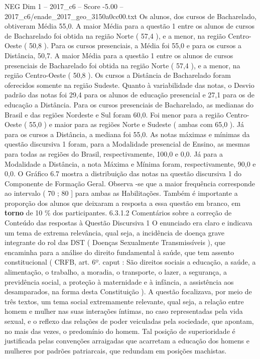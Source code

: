 \begin{textsample}{NEG Dim 1 – 2017\_c6 – Score -5.00 – 2017\_c6/enade\_2017\_geo\_3150a0cc00.txt}
Os alunos, dos cursos de Bacharelado, obtiveram Média 55,0.
A maior Média para a questão 1 entre os alunos de cursos de Bacharelado foi obtida na região Norte ( 57,4 ), e a menor, na região Centro-Oeste ( 50,8 ).
Para os cursos presenciais, a Média foi 55,0 e para os cursos a Distância, 50,7.
A maior Média para a questão 1 entre os alunos de cursos presenciais de Bacharelado foi obtida na região Norte ( 57,4 ), e a menor, na região Centro-Oeste ( 50,8 ).
Os cursos a Distância de Bacharelado foram oferecidos somente na região Sudeste.
Quanto à variabilidade das notas, o Desvio padrão das notas foi 29,4 para os alunos de educação presencial e 27,1 para os de educação a Distância.
Para os cursos presenciais de Bacharelado, as medianas do Brasil e das regiões Nordeste e Sul foram 60,0.
Foi menor para a região Centro-Oeste ( 55,0 ) e maior para as regiões Norte e Sudeste ( ambas com 65,0 ).
Já para os cursos a Distância, a mediana foi 55,0.
As notas máximas e mínimas da questão discursiva 1 foram, para a Modalidade presencial de Ensino, as mesmas para todas as regiões do Brasil, respectivamente, 100,0 e 0,0.
Já para a Modalidade a Distância, a nota Máxima e Mínima foram, respectivamente, 90,0 e 0,0.
O Gráfico 6.7 mostra a distribuição das notas na questão discursiva 1 do Componente de Formação Geral.
Observa -se que a maior frequência corresponde ao intervalo ( 70 ; 80 ] para ambas as Habilitações.
Também é importante a proporção dos alunos que deixaram a resposta a essa questão em branco, em \textbf{torno} de 10 \% dos participantes. 6.3.1.2 Comentários sobre a correção de Conteúdo das respostas à Questão Discursiva 1 O enunciado era claro e indicava um tema de extrema relevância, qual seja, a incidência de doença grave integrante do rol das DST ( Doenças Sexualmente Transmissíveis ), que encaminha para a análise do direito fundamental à saúde, que tem assento constitucional ( CRFB, art. 6º. caput : São direitos sociais a educação, a saúde, a alimentação, o trabalho, a moradia, o transporte, o lazer, a segurança, a previdência social, a proteção à maternidade e à infância, a assistência aos desamparados, na forma desta Constituição ).
A questão focalizava, por meio de três textos, um tema social extremamente relevante, qual seja, a relação entre homem e mulher nas suas interações íntimas, no caso representadas pela vida sexual, e o reflexo das relações de poder veiculadas pela sociedade, que apontam, no mais das vezes, o predomínio do homem.
Tal posição de superioridade é justificada pelas convenções arraigadas que acarretam a educação dos homens e mulheres por padrões patriarcais, que redundam em posições machistas.

\end{textsample}
